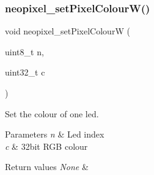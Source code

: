 \subsubsection{\texorpdfstring{neopixel\+\_\+set\+Pixel\+Colour\+W()}{neopixel\_setPixelColourW()}}
{\footnotesize\ttfamily void neopixel\+\_\+set\+Pixel\+ColourW (\begin{DoxyParamCaption}\item[{uint8\+\_\+t}]{n,  }\item[{uint32\+\_\+t}]{c }\end{DoxyParamCaption})}



Set the colour of one led. 


\begin{DoxyParams}{Parameters}
{\em n} & Led index \\
\hline
{\em c} & 32bit R\+GB colour \\
\hline
\end{DoxyParams}

\begin{DoxyRetVals}{Return values}
{\em None} & \\
\hline
\end{DoxyRetVals}
